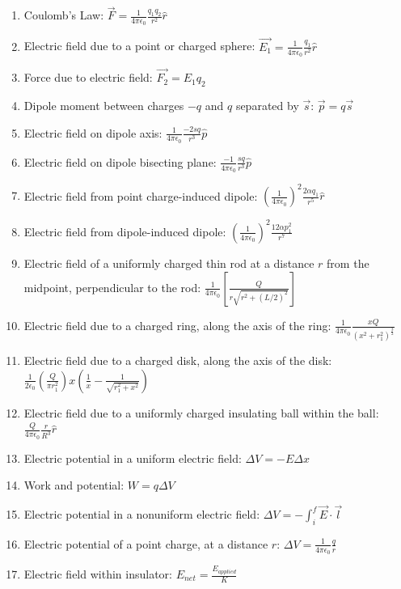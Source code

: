 \documentclass[nobib]{tufte-handout}
\begin{document}
\begin{enumerate}
    \item Coulomb's Law: $\vec{F} = \frac{1}{4\pi \epsilon_0}\frac{q_1 q_2}{r^2}\hat{r}$
    \item Electric field due to a point or charged sphere: $\vec{E_1} = \frac{1}{4\pi \epsilon_0}\frac{q_1}{r^2}\hat{r}$
    \item Force due to electric field: $\vec{F_2} = E_1 q_2$
    \item Dipole moment between charges $-q$ and $q$ separated by $\vec{s}$: $\vec{p} = q\vec{s}$
    \item Electric field on dipole axis: $\frac{1}{4\pi \epsilon_0}\frac{-2sq}{r^3}\hat{p}$
    \item Electric field on dipole bisecting plane: $\frac{-1}{4 \pi \epsilon_0}\frac{sq}{r^3}\hat{p}$
    \item Electric field from point charge-induced dipole: $\left(\frac{1}{4\pi \epsilon_0}\right)^2 \frac{2 \alpha q_1}{r^5}\hat{r}$
    \item Electric field from dipole-induced dipole: $\left(\frac{1}{4\pi \epsilon_0}\right)^2 \frac{12 \alpha p_1^2}{r^7}$
    \item Electric field of a uniformly charged thin rod at a distance $r$ from the midpoint,
    perpendicular to the rod: $\frac{1}{4 \pi \epsilon_0}\left[\frac{Q}{r\sqrt{r^2+(L/2)^2}}\right]$
    \item Electric field due to a charged ring, along the axis of the ring:
    $\frac{1}{4 \pi \epsilon_0}\frac{xQ}{\left(x^{2}+r_{1}^{2}\right)^{\frac{3}{2}}}$
    \item Electric field due to a charged disk, along the axis of the disk:
    $\frac{1}{2 \epsilon_0}\left(\frac{Q}{\pi r_{1}^{2}}\right)x\left(\frac{1}{x}-\frac{1}{\sqrt{r_{1}^{2}+x^{2}}}\right)$
    \item Electric field due to a uniformly charged insulating ball within the ball: 
    $\frac{Q}{4\pi \epsilon_0}\frac{r}{R^3}\hat{r}$
    \item Electric potential in a uniform electric field: $\Delta V = -E\Delta x$
    \item Work and potential: $W = q\Delta V$
    \item Electric potential in a nonuniform electric field: $\Delta V = -\int_{i}^{f} \vec{E} \cdot \vec{l}$
    \item Electric potential of a point charge, at a distance $r$: $\Delta V = \frac{1}{4\pi \epsilon_0}\frac{q}{r}$
    \item Electric field within insulator: $E_{net} = \frac{E_{applied}}{K}$

\end{enumerate}
\end{document}
